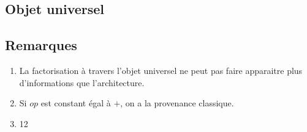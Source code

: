 \documentclass[11pt,a4paper]{article}
\begin{document}
	\subsection{Objet universel}
	
	\subsection{Remarques}
	
	\begin{enumerate}
	
		\item La factorisation à travers l'objet universel ne peut pas faire apparaitre plus d'informations que l'architecture.
		
		\item Si $op$ est constant égal à $+$, on a la provenance classique.
		
		\item 12
	
	\end{enumerate}
	
\end{document}
